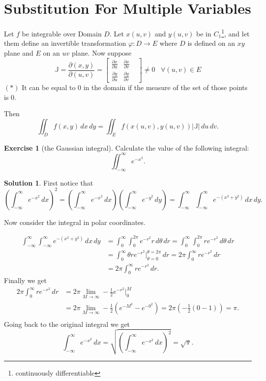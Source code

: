 \documentclass[11pt,a4paper]{article}
\theoremstyle{definition}
\newtheorem*{solution}{Solution}
\newtheorem{exercise}{Exercise}[section]
\theoremstyle{plain}
\begin{document}
	\newpage
	\section{Substitution For Multiple Variables}
	Let $f$ be integrable over Domain $D$.
  Let $x(u,v)$ and $y(u,v)$ be in $C_1$\footnote{continuously differentiable},
  and let them define an invertible transformation $\varphi:D\to E$ 
  where $D$ is defined on an $xy$ plane and $E$ on an $uv$ plane.
  Now suppose
	\[
		\mathbb{J} =\frac{\partial(x,y)}{\partial(u,v)} = 
	  \begin{bmatrix}
      \frac{\partial x}{\partial u} & 
      \frac{\partial x}{\partial v} & \\[1ex]
      \frac{\partial y}{\partial u} & 
      \frac{\partial y}{\partial v}
	  \end{bmatrix} \neq 0 \;\;\;\forall (u,v)\in E
	\]
	$(*)$ It can be equal to $0$ in the domain if the measure of the set of
  those points is $0$.

	Then
	\[
		\iint_D f(x,y) \, dx \, dy =
    \iint_E f(x(u,v),y(u,v)) |\mathbb{J}| \, du \, dv.
	\]


	\newpage
  \begin{exercise}[the Gaussian integral]
    Calculate the value of the following integral:
    \[
      \iint_{-\infty}^{\infty} e^{-x^2}.
    \]
  \end{exercise}
  \begin{solution}
    First notice that
    \[
      \left(\int_{-\infty}^\infty{e^{-x^2}}\, dx\right)^2 = 
      \left(\int_{-\infty}^\infty{e^{-x^2}}\, dx\right) 
      \left(\int_{-\infty}^\infty{e^{-y^2}}\, dy\right) = 
      \int_{-\infty}^\infty\int_{-\infty}^\infty{e^{-(x^2+y^2)}}\, dx\, dy.
    \]

    Now consider the integral in polar coordinates.

    \begin{align*}
      \int_{-\infty}^{\infty}
      \int_{-\infty}^{\infty} e^{-(x^2+y^2)} \, dx\, dy &=
      \int_{0}^{\infty} \int_{0}^{2\pi} e^{-r^2}r\, d\theta\, dr = 
      \int_{0}^{\infty} \int_{0}^{2\pi} r e^{-r^2}\, d\theta\, dr \\ &=
      \int_{0}^{\infty} \theta r e^{-r^2} 
      \biggr\vert^{\theta = 2\pi}_{\theta = 0}\, dr =
      2 \pi \int_{0}^{\infty} r e^{-r^2}\, dr \\ &=
      2 \pi \int_{0}^{\infty} r e^{-r^2}\, dr.
    \end{align*}
    Finally we get 
    \begin{align*}
      2 \pi \int_{0}^{\infty} r e^{-r^2}\, dr &= 
      2 \pi \lim_{M\to\infty} -\frac 12{e^{-r^2}}\biggr\vert^M_0 \\ &=
      2 \pi \lim_{M\to\infty} -\frac 12   (e^{-M^2} - e^{-0^2}) =
      2 \pi (- \frac 12(0-1)) = \pi. \\
    \end{align*}
    Going back to the original integral we get
    \[
      \int_{-\infty}^\infty{e^{-x^2}}\, dx =
      \sqrt{\left(\int_{-\infty}^\infty{e^{-x^2}}\, dx\right)^2} =
      \sqrt{\pi}.
    \]
  \end{solution}
  
\end{document}
